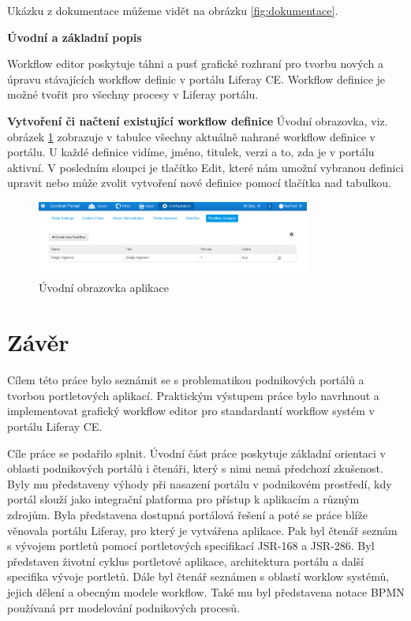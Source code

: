 \documentclass{fithesis}
\begin{document}
Ukázku z dokumentace můžeme vidět na obrázku \ref{fig:dokumentace}.

\textbf{Úvodní a základní popis}

Workflow editor poskytuje táhni a pusť grafické rozhraní pro tvorbu nových a úpravu stávajících workflow definic v portálu Liferay CE. Workflow definice je možné tvořit pro všechny procesy v Liferay portálu.

\textbf{Vytvoření či načtení existující workflow definice}
Úvodní obrazovka, viz. obrázek \ref{fig:uvodni_obrazovka} zobrazuje v tabulce všechny aktuálně nahrané workflow definice v portálu. U každé definice vidíme, jméno, titulek, verzi a to, zda je v portálu aktivní. V posledním sloupci je tlačítko Edit, které nám umožní vybranou definici upravit nebo může zvolit vytvoření nové definice pomocí tlačítka nad tabulkou.


\begin{figure}[htp]
\centering
\includegraphics[width=340px]{images/01_uvodni_obrazovka.png}
\caption{Úvodní obrazovka aplikace}
\label{fig:uvodni_obrazovka}
\end{figure}

\chapter*{Závěr}
Cílem této práce bylo seznámit se s problematikou podnikových portálů a tvorbou portletových aplikací. Praktickým výstupem práce bylo navrhnout a implementovat grafický workflow editor pro standardantí workflow systém v portálu Liferay CE.

Cíle práce se podařilo splnit. Úvodní část práce poskytuje základní orientaci v oblasti podnikových portálů i čtenáři, který s nimi nemá předchozí zkušenost. Byly mu představeny výhody při nasazení portálu v podnikovém prostředí, kdy portál slouží jako integrační platforma pro přístup k aplikacím a různým zdrojům. Byla představena dostupná portálová řešení a poté se práce blíže věnovala portálu Liferay, pro který je vytvářena aplikace. Pak byl čtenář seznám s vývojem portletů pomocí portletových specifikací JSR-168 a JSR-286. Byl představen životní cyklus portletové aplikace, architektura portálu a další specifika vývoje portletů. Dále byl čtenář seznámen s oblastí worklow systémů, jejich dělení a obecným modele workflow. Také mu byl představena notace BPMN používaná prr modelování podnikových procesů.
\end{document}
